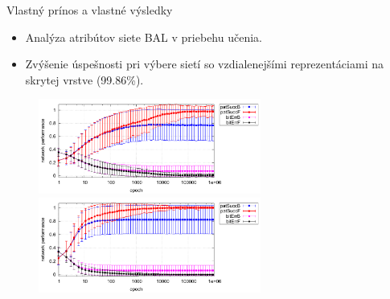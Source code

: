 \documentclass[xcolor=dvipsnames]{beamer}
\begin{document}
\begin{frame}{Vlastný prínos a vlastné výsledky}
  \begin{itemize}
    \item Analýza atribútov siete BAL v priebehu učenia. 
    \item Zvýšenie úspešnosti pri výbere sietí so vzdialenejšími reprezentáciami na skrytej vrstve (99.86\%). 
  \end{itemize} 
  
  \begin{figure}[h!]  
    \centering
    \vspace{-8pt} 
    \includegraphics[width=0.65\textwidth]{../text/img/tlr-auto4-best-perf.pdf}\\
    \includegraphics[width=0.65\textwidth]{../text/img/tlr-auto4-best-can.pdf}    
  \end{figure} 
\end{frame}


\end{document}

